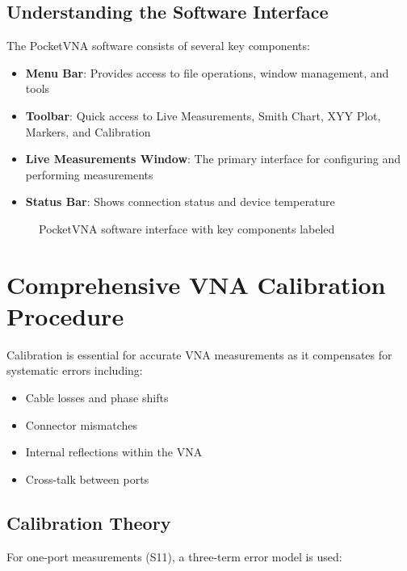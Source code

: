 \documentclass[12pt,a4paper]{article}
\begin{document}
\subsection{Understanding the Software Interface}

The PocketVNA software consists of several key components:

\begin{itemize}
    \item \textbf{Menu Bar}: Provides access to file operations, window management, and tools
    \item \textbf{Toolbar}: Quick access to Live Measurements, Smith Chart, XYY Plot, Markers, and Calibration
    \item \textbf{Live Measurements Window}: The primary interface for configuring and performing measurements
    \item \textbf{Status Bar}: Shows connection status and device temperature
\end{itemize}

\begin{figure}[H]
    \centering
    \caption{PocketVNA software interface with key components labeled}
    \label{fig:software_interface}
\end{figure}

\section{Comprehensive VNA Calibration Procedure}

Calibration is essential for accurate VNA measurements as it compensates for systematic errors including:
\begin{itemize}
    \item Cable losses and phase shifts
    \item Connector mismatches
    \item Internal reflections within the VNA
    \item Cross-talk between ports
\end{itemize}

\subsection{Calibration Theory}

For one-port measurements (S11), a three-term error model is used:
\end{document}
